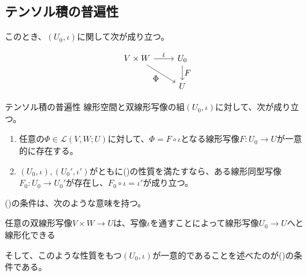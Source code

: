\documentclass[../../../topic_linear-algebra]{subfiles}
\begin{document}
\subsection{テンソル積の普遍性}

このとき、$(U_0, \iota)$に関して次が成り立つ。

\begin{equation*}
  \begin{tikzcd}[every label/.append style = {font = \normalsize}]
    V \times W \arrow[r,"\iota"]\arrow[rd, "\Phi"'] & U_0 \arrow[d,"F"]\\
    & U
  \end{tikzcd}
\end{equation*}

\begin{theorem}{テンソル積の普遍性}
  線形空間と双線形写像の組$(U_0, \iota)$に対して、次が成り立つ。
  \begin{enumerate}[label=\romanlabel]
    \item 任意の$\Phi \in \mathcal{L}(V, W; U)$に対して、$\Phi = F \circ \iota$となる線形写像$F\colon U_0 \to U$が一意的に存在する。
    \item $(U_0, \iota), (U_0', \iota')$がともに()の性質を満たすなら、ある線形同型写像$F_0 \colon U_0 \to U_0'$が存在し、$F_0 \circ \iota = \iota'$が成り立つ。
  \end{enumerate}
\end{theorem}

()の条件は、次のような意味を持つ。
\begin{emphabox}
  \begin{spacebox}
    \begin{center}
      任意の双線形写像$V \times W \to U$は、写像$\iota$を通すことによって線形写像$U_0 \to U$へと線形化できる
    \end{center}
  \end{spacebox}
\end{emphabox}

そして、このような性質をもつ$(U_0, \iota)$が一意的であることを述べたのが()の条件である。
\end{document}
